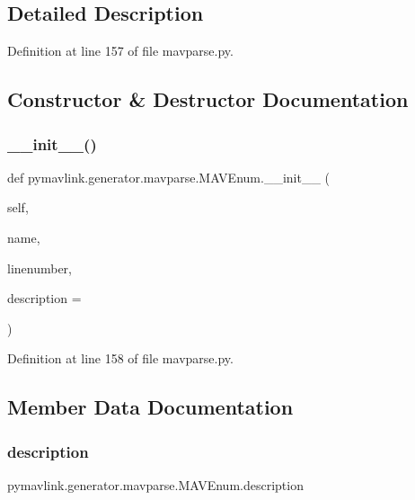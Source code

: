 \subsection{Detailed Description}


Definition at line 157 of file mavparse.\+py.



\subsection{Constructor \& Destructor Documentation}
\mbox{\label{classpymavlink_1_1generator_1_1mavparse_1_1MAVEnum_a2f523a538af870a22eade7a19ec76ccc}} 
\subsubsection{\texorpdfstring{\_\_init\_\_()}{\_\_init\_\_()}}
{\footnotesize\ttfamily def pymavlink.\+generator.\+mavparse.\+M\+A\+V\+Enum.\+\_\+\+\_\+init\+\_\+\+\_\+ (\begin{DoxyParamCaption}\item[{}]{self,  }\item[{}]{name,  }\item[{}]{linenumber,  }\item[{}]{description = {\ttfamily \textquotesingle{}\textquotesingle{}} }\end{DoxyParamCaption})}



Definition at line 158 of file mavparse.\+py.



\subsection{Member Data Documentation}
\mbox{\label{classpymavlink_1_1generator_1_1mavparse_1_1MAVEnum_a66ed34a84607dffbd68dca1f02eb78ae}} 
\subsubsection{\texorpdfstring{description}{description}}
{\footnotesize\ttfamily pymavlink.\+generator.\+mavparse.\+M\+A\+V\+Enum.\+description}



